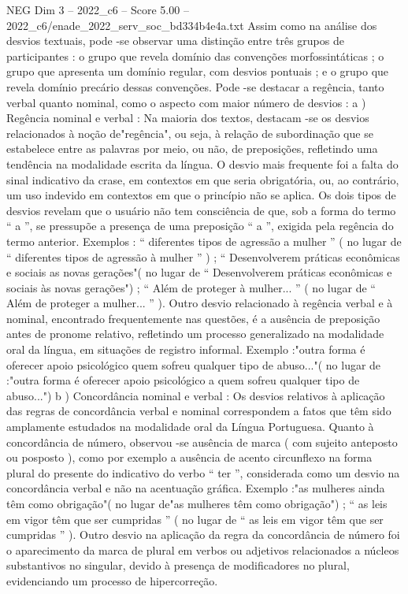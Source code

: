 \begin{textsample}{NEG Dim 3 – 2022\_c6 – Score 5.00 – 2022\_c6/enade\_2022\_serv\_soc\_bd334b4e4a.txt}
Assim como na análise dos desvios textuais, pode -se observar uma distinção entre três grupos de participantes : o grupo que revela domínio das convenções morfossintáticas ; o grupo que apresenta um domínio regular, com desvios pontuais ; e o grupo que revela domínio precário dessas convenções.
Pode -se destacar a regência, tanto verbal quanto nominal, como o aspecto com maior número de desvios : a ) Regência nominal e verbal : Na maioria dos textos, destacam -se os desvios relacionados à noção de"regência", ou seja, à relação de subordinação que se estabelece entre as palavras por meio, ou não, de preposições, refletindo uma tendência na modalidade escrita da língua.
O desvio mais frequente foi a falta do sinal indicativo da crase, em contextos em que seria obrigatória, ou, ao contrário, um uso indevido em contextos em que o princípio não se aplica.
Os dois tipos de desvios revelam que o usuário não tem consciência de que, sob a forma do termo “ a ”, se pressupõe a presença de uma preposição “ a ”, exigida pela regência do termo anterior.
Exemplos : “ diferentes tipos de agressão a mulher ” ( no lugar de “ diferentes tipos de agressão à mulher ” ) ; “ Desenvolverem práticas econômicas e sociais as novas gerações"( no lugar de “ Desenvolverem práticas econômicas e sociais às novas gerações") ; “ Além de proteger à mulher... ” ( no lugar de “ Além de proteger a mulher... ” ).
Outro desvio relacionado à regência verbal e à nominal, encontrado frequentemente nas questões, é a ausência de preposição antes de pronome relativo, refletindo um processo generalizado na modalidade oral da língua, em situações de registro informal.
Exemplo :"outra forma é oferecer apoio psicológico quem sofreu qualquer tipo de abuso..."( no lugar de :"outra forma é oferecer apoio psicológico a quem sofreu qualquer tipo de abuso...") b ) Concordância nominal e verbal : Os desvios relativos à aplicação das regras de concordância verbal e nominal correspondem a fatos que têm sido amplamente estudados na modalidade oral da Língua Portuguesa.
Quanto à concordância de número, observou -se ausência de marca ( com sujeito anteposto ou posposto ), como por exemplo a ausência de acento circunflexo na forma plural do presente do indicativo do verbo “ ter ”, considerada como um desvio na concordância verbal e não na acentuação gráfica.
Exemplo :"as mulheres ainda têm como obrigação"( no lugar de"as mulheres têm como obrigação") ; “ as leis em vigor têm que ser cumpridas ” ( no lugar de “ as leis em vigor têm que ser cumpridas ” ).
Outro desvio na aplicação da regra da concordância de número foi o aparecimento da marca de plural em verbos ou adjetivos relacionados a núcleos substantivos no singular, devido à presença de modificadores no plural, evidenciando um processo de hipercorreção.

\end{textsample}
